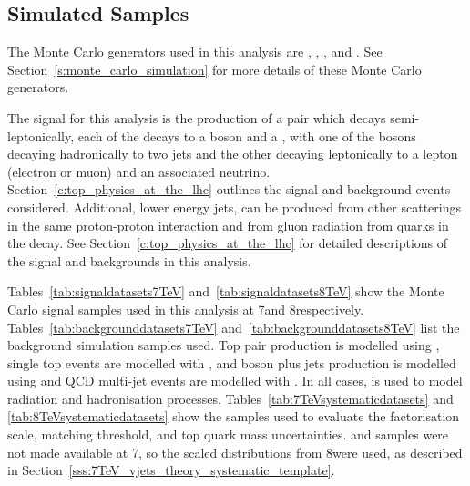 


\FloatBarrier

\subsection{Simulated Samples}
\label{ss:simulated_samples}
The Monte Carlo generators used in this analysis are \MADGRAPH \cite{madgraph5}, \PYTHIA \cite{pythia8},
\POWHEG \cite{powheg_Nason, powheg_Frixione, powheg_Alioli}, \HERWIG \cite{herwig} and \MCATNLO
\cite{mcatnlo_Frixione1, mcatnlo_Frixione2}. See Section~\ref{s:monte_carlo_simulation} for more details of
these Monte Carlo generators.

The signal for this analysis is the production of a \ttbar pair which decays semi-leptonically, \ie each of
the \tquarks decays to a \W boson and a \bjet, with one of the \W bosons decaying hadronically to two jets and
the other decaying leptonically to a lepton (electron or muon) and an associated neutrino.
Section~\ref{c:top_physics_at_the_lhc} outlines the signal and background events considered. Additional, lower
energy jets, can be produced from other scatterings in the same proton-proton interaction and from gluon
radiation from quarks in the decay. See Section~\ref{c:top_physics_at_the_lhc} for detailed descriptions of
the signal and backgrounds in this analysis.

Tables~\ref{tab:signaldatasets7TeV} and~\ref{tab:signaldatasets8TeV} show the Monte Carlo signal samples used
in this analysis at 7\TeV and 8\TeV respectively. Tables~\ref{tab:backgrounddatasets7TeV}
and~\ref{tab:backgrounddatasets8TeV} %
list the background simulation samples used. Top pair production is modelled using \MADGRAPH, single top
events are modelled with \POWHEG, \W and \Z boson plus jets production is modelled using \MADGRAPH and QCD
multi-jet events are modelled with \PYTHIA. In all cases, \PYTHIA is used to model radiation and hadronisation
processes. Tables~\ref{tab:7TeVsystematicdatasets} and \ref{tab:8TeVsystematicdatasets} show the samples used
to evaluate the factorisation scale, matching threshold, and top quark mass uncertainties. \WpJets and \ZpJets
samples were not made available at 7\TeV, so the scaled distributions from 8\TeV were used, as described in
Section~\ref{sss:7TeV_vjets_theory_systematic_template}.






